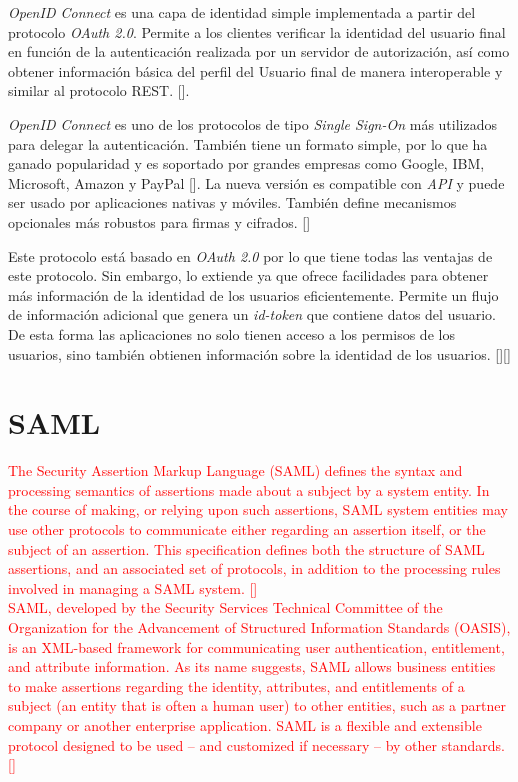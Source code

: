 \textit{OpenID Connect} es una capa de identidad simple implementada a partir del protocolo \textit{OAuth 2.0}. Permite a los clientes verificar la identidad del usuario final en función de la autenticación realizada por un servidor de autorización, así como obtener información básica del perfil del Usuario final de manera interoperable y similar al protocolo REST. [\cite{openid-doc}]. 

\textit{OpenID Connect }es uno de los protocolos de tipo \textit{Single Sign-On} más utilizados para delegar la autenticación. También tiene un formato simple, por lo que ha ganado popularidad y es soportado por grandes empresas como Google, IBM, Microsoft, Amazon y PayPal [\cite{mainka2017sok}]. La nueva versión es compatible con \textit{API} y puede ser usado por aplicaciones nativas y móviles. También define mecanismos opcionales más robustos para firmas y cifrados. [\cite{openid-doc}]

Este protocolo está basado en \textit{OAuth 2.0} por lo que tiene todas las ventajas de este protocolo. Sin embargo, lo extiende ya que ofrece facilidades para obtener más información de la identidad de los usuarios eficientemente. Permite un flujo de información adicional que genera un \textit{id-token} que contiene datos del usuario. De esta forma las aplicaciones no solo tienen acceso a los permisos de los usuarios, sino también obtienen información sobre la identidad de los usuarios.  [\cite{openid-doc}][\cite{kutera2016single}]

\section{SAML}
\textcolor{red}{ The Security Assertion Markup Language (SAML) defines the syntax and processing semantics of
assertions made about a subject by a system entity. In the course of making, or relying upon such
assertions, SAML system entities may use other protocols to communicate either regarding an assertion
itself, or the subject of an assertion. This specification defines both the structure of SAML assertions, and
an associated set of protocols, in addition to the processing rules involved in managing a SAML system. [\cite{philpott2015assertions}]
\\
SAML, developed by the Security Services Technical Committee of the Organization for the Advancement of Structured Information Standards (OASIS), is an XML-based framework for communicating user authentication, entitlement, and attribute information. As its name suggests, SAML allows business entities to make assertions regarding the identity, attributes, and entitlements of a subject (an entity that is often a human user) to other entities, such as a partner company or another enterprise application. SAML is a flexible and extensible protocol designed to be used – and customized if necessary
– by other standards. [\cite{wisniewski2005saml}]}

